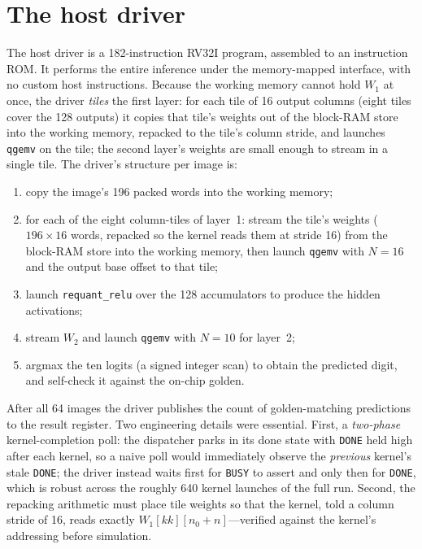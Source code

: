 \documentclass[12pt,a4paper,oneside]{report}
\newcommand{\code}[1]{\texttt{#1}}
\begin{document}
\section{The host driver}
The host driver is a \num{182}-instruction RV32I program, assembled to an
instruction ROM. It performs the entire inference under the memory-mapped
interface, with no custom host instructions. Because the working memory cannot hold
$W_1$ at once, the driver \emph{tiles} the first layer: for each tile of 16 output
columns (eight tiles cover the 128 outputs) it copies that tile's weights out of
the block-RAM store into the working memory, repacked to the tile's column stride,
and launches \code{qgemv} on the tile; the second layer's weights are small enough
to stream in a single tile. The driver's structure per image is:
\begin{enumerate}
\item copy the image's 196 packed words into the working memory;
\item for each of the eight column-tiles of layer~1: stream the tile's weights
($196\times 16$ words, repacked so the kernel reads them at stride 16) from the
block-RAM store into the working memory, then launch \code{qgemv} with $N=16$ and
the output base offset to that tile;
\item launch \code{requant\_relu} over the 128 accumulators to produce the hidden
activations;
\item stream $W_2$ and launch \code{qgemv} with $N=10$ for layer~2;
\item argmax the ten logits (a signed integer scan) to obtain the predicted digit,
and self-check it against the on-chip golden.
\end{enumerate}
After all 64 images the driver publishes the count of golden-matching predictions
to the result register. Two engineering details were essential. First, a
\emph{two-phase} kernel-completion poll: the dispatcher parks in its done state
with \code{DONE} held high after each kernel, so a naive poll would immediately
observe the \emph{previous} kernel's stale \code{DONE}; the driver instead waits
first for \code{BUSY} to assert and only then for \code{DONE}, which is robust
across the roughly 640 kernel launches of the full run. Second, the repacking
arithmetic must place tile weights so that the kernel, told a column stride of 16,
reads exactly $W_1[kk][n_0+n]$---verified against the kernel's addressing before
simulation.
\end{document}
